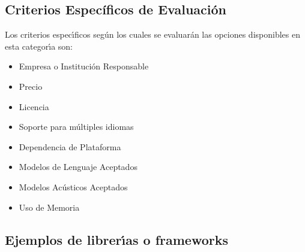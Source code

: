 \subsection{Criterios Espec\'ificos de Evaluaci\'on}

Los criterios espec{\'\i}ficos seg\'un los cuales se evaluar\'an las opciones disponibles en esta
categor{\'\i}a son:

\begin{itemize}
	\item Empresa o Instituci\'on Responsable
	\item Precio
	\item Licencia
	\item Soporte para m\'ultiples idiomas
	\item Dependencia de Plataforma
	\item Modelos de Lenguaje Aceptados
	\item Modelos Ac\'usticos Aceptados
	\item Uso de Memoria
\end{itemize}


\subsection{Ejemplos de librer{\'\i}as o frameworks}






